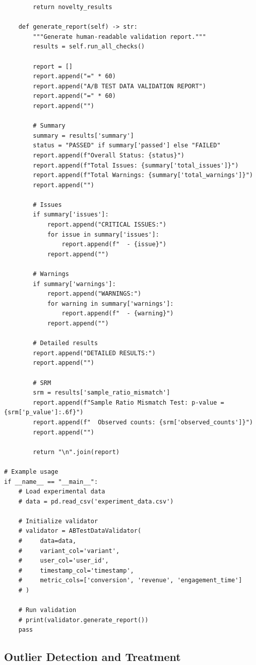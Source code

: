 \begin{lstlisting}
        return novelty_results

    def generate_report(self) -> str:
        """Generate human-readable validation report."""
        results = self.run_all_checks()

        report = []
        report.append("=" * 60)
        report.append("A/B TEST DATA VALIDATION REPORT")
        report.append("=" * 60)
        report.append("")

        # Summary
        summary = results['summary']
        status = "PASSED" if summary['passed'] else "FAILED"
        report.append(f"Overall Status: {status}")
        report.append(f"Total Issues: {summary['total_issues']}")
        report.append(f"Total Warnings: {summary['total_warnings']}")
        report.append("")

        # Issues
        if summary['issues']:
            report.append("CRITICAL ISSUES:")
            for issue in summary['issues']:
                report.append(f"  - {issue}")
            report.append("")

        # Warnings
        if summary['warnings']:
            report.append("WARNINGS:")
            for warning in summary['warnings']:
                report.append(f"  - {warning}")
            report.append("")

        # Detailed results
        report.append("DETAILED RESULTS:")
        report.append("")

        # SRM
        srm = results['sample_ratio_mismatch']
        report.append(f"Sample Ratio Mismatch Test: p-value = {srm['p_value']:.6f}")
        report.append(f"  Observed counts: {srm['observed_counts']}")
        report.append("")

        return "\n".join(report)

# Example usage
if __name__ == "__main__":
    # Load experimental data
    # data = pd.read_csv('experiment_data.csv')

    # Initialize validator
    # validator = ABTestDataValidator(
    #     data=data,
    #     variant_col='variant',
    #     user_col='user_id',
    #     timestamp_col='timestamp',
    #     metric_cols=['conversion', 'revenue', 'engagement_time']
    # )

    # Run validation
    # print(validator.generate_report())
    pass
\end{lstlisting}

\subsection{Outlier Detection and Treatment}

